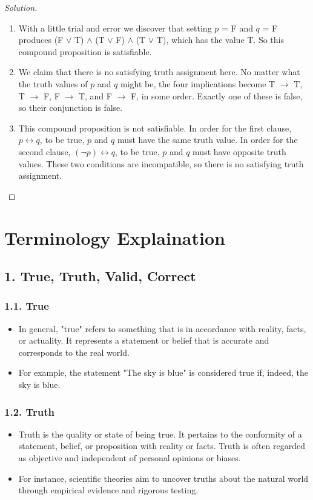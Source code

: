 \documentclass{article}
\newenvironment{solution}{\renewcommand\qedsymbol{}\begin{proof}[Solution]}{\end{proof}}
\begin{document}
\begin{solution}
\hspace{1pt}

\begin{enumerate}[leftmargin=16pt, topsep = 8pt]
\item With a little trial and error we discover that setting $p$ = F and $q$ = F produces (F $\lor$ T) $\land$ (T $\lor$ F) $\land$ (T $\lor$ T), which has the value T. So this compound proposition is satisfiable.
\item We claim that there is no satisfying truth assignment here. No matter what the truth values of $p$ and $q$ might be, the four implications become T $\rightarrow$ T, T $\rightarrow$ F, F $\rightarrow$ T, and F $\rightarrow$ F, in some order. Exactly one of these is false, so their conjunction is false.
\item This compound proposition is not satisfiable. In order for the first clause, $p \leftrightarrow q$, to be true, $p$ and $q$ must have the same truth value. In order for the second clause, $(\neg p) \leftrightarrow q$, to be true, $p$ and $q$ must have opposite truth values. These two conditions are incompatible, so there is no satisfying truth assignment.
\end{enumerate}
\end{solution}

\clearpage
\section*{Terminology Explaination}
\subsection*{1. True, Truth, Valid, Correct}
\subsubsection*{1.1. True}
\begin{itemize}
\item In general, "true" refers to something that is in accordance with reality, facts, or actuality. It represents a statement or belief that is accurate and corresponds to the real world.
\item For example, the statement "The sky is blue" is considered true if, indeed, the sky is blue.
\end{itemize}
\subsubsection*{1.2. Truth}
\begin{itemize}
\item Truth is the quality or state of being true. It pertains to the conformity of a statement, belief, or proposition with reality or facts. Truth is often regarded as objective and independent of personal opinions or biases.
\item For instance, scientific theories aim to uncover truths about the natural world through empirical evidence and rigorous testing.
\end{itemize}
\end{document}
